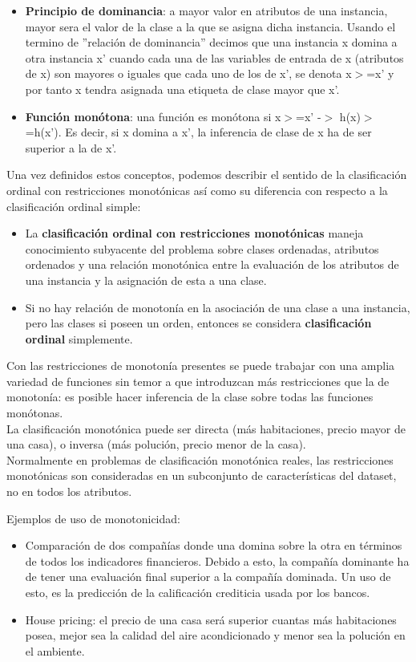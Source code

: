 \begin{itemize}
	\item \textbf{Principio de dominancia}: a mayor valor en atributos de una instancia, mayor sera el
	valor de la clase a la que se asigna dicha instancia.
	Usando el termino de ''relación de dominancia'' decimos que una instancia x domina a
	otra instancia x' cuando cada una de las variables de entrada de x (atributos de x)
	son mayores o iguales que cada uno de los de x', se denota x$>$=x' y por tanto
	x tendra asignada una etiqueta de clase mayor que x'.
	\item \textbf{Función monótona}: una función es monótona si x$>$=x' -$>$ h(x)$>$=h(x'). Es decir, si x domina a x', la
	inferencia de clase de x ha de ser superior a la de x'.
\end{itemize}

Una vez definidos estos conceptos, podemos describir el sentido de la clasificación ordinal con restricciones monotónicas así como su diferencia con respecto a la clasificación ordinal simple:

\begin{itemize}
	\item La \textbf{clasificación ordinal con restricciones monotónicas} maneja conocimiento subyacente del
	problema sobre clases ordenadas, atributos ordenados y una relación monotónica entre
	la evaluación de los atributos de una instancia y la asignación de esta a una clase.
	\item Si no hay relación de monotonía en la asociación de una clase a una instancia, 
	pero las clases si poseen un orden, entonces se considera\textbf{ clasificación ordinal} simplemente.
\end{itemize}

Con las restricciones de monotonía presentes se puede trabajar con una amplia
variedad de funciones sin temor a que introduzcan más restricciones que 
la de monotonía: es posible hacer inferencia de la clase sobre todas las funciones
monótonas.\\
La clasificación monotónica puede ser directa (más habitaciones, precio mayor
de una casa), o inversa (más polución, precio menor de la casa).\\
Normalmente en problemas de clasificación monotónica reales, las restricciones
monotónicas son consideradas en un subconjunto de características del dataset, no en todos los atributos.

Ejemplos de uso de monotonicidad:
\begin{itemize}
	\item Comparación de dos compañías donde una domina sobre la otra en términos de
	todos los indicadores financieros. Debido a esto, la compañía dominante
	ha de tener una evaluación final superior a la compañía dominada. Un uso
	de esto, es la predicción de la calificación crediticia usada por los bancos.
	\item House pricing: el precio de una casa será superior cuantas más habitaciones
	posea, mejor sea la calidad del aire acondicionado y menor sea la polución
	en el ambiente.
\end{itemize}



